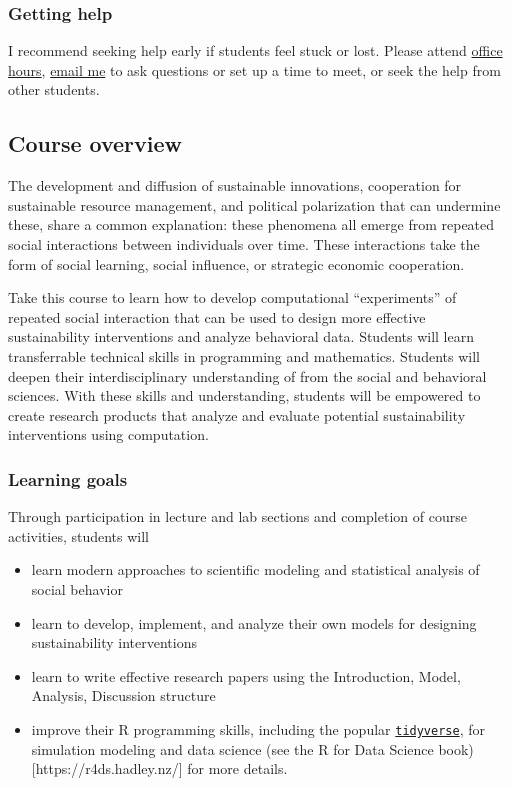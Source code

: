 \documentclass[letterpaper]{article}
\providecommand{\tightlist}{%
  \setlength{\itemsep}{0pt}\setlength{\parskip}{0pt}}
\begin{document}
\subsubsection{Getting help}\label{getting-help}

I recommend seeking help early if students feel stuck or lost. Please
attend \hyperref[office-hours]{office hours},
\href{mailto:maturner@stanford.edu}{email me} to ask questions or set up
a time to meet, or seek the help from other students.

\subsection{Course overview}\label{course-overview}

The development and diffusion of sustainable innovations, cooperation
for sustainable resource management, and political polarization that can
undermine these, share a common explanation: these phenomena all emerge
from repeated social interactions between individuals over time. These
interactions take the form of social learning, social influence, or
strategic economic cooperation.

Take this course to learn how to develop computational ``experiments''
of repeated social interaction that can be used to design more effective
sustainability interventions and analyze behavioral data. Students will
learn transferrable technical skills in programming and mathematics.
Students will deepen their interdisciplinary understanding of from the
social and behavioral sciences. With these skills and understanding,
students will be empowered to create research products that analyze and
evaluate potential sustainability interventions using computation.

\subsubsection{Learning goals}\label{learning-goals}

Through participation in lecture and lab sections and completion of
course activities, students will

\begin{itemize}
\tightlist
\item
  learn modern approaches to scientific modeling and statistical
  analysis of social behavior
\item
  learn to develop, implement, and analyze their own models for
  designing sustainability interventions
\item
  learn to write effective research papers using the Introduction,
  Model, Analysis, Discussion structure
\item
  improve their R programming skills, including the popular
  \href{https://www.tidyverse.org/}{\texttt{tidyverse}}, for simulation
  modeling and data science (see the R for Data Science
  book){[}https://r4ds.hadley.nz/{]} for more details.
\end{itemize}
\end{document}
